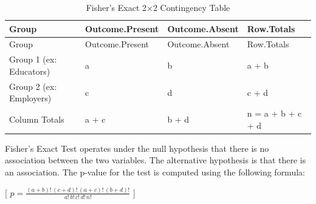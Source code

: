 \documentclass[
  11pt,
  letterpaper,
  DIV=11,
  numbers=noendperiod]{scrartcl}
\numberwithin{figure}{section}
\begin{document}
\begin{longtable}[]{@{}
  >{\raggedright\arraybackslash}p{}
  >{\raggedleft\arraybackslash}p{}
  >{\raggedleft\arraybackslash}p{}
  >{\raggedright\arraybackslash}p{}@{}}
\caption{Fisher's Exact 2×2 Contingency Table}\tabularnewline
\toprule\noalign{}
\begin{minipage}[b]{\linewidth}\raggedright
Group
\end{minipage} & \begin{minipage}[b]{\linewidth}\raggedleft
Outcome.Present
\end{minipage} & \begin{minipage}[b]{\linewidth}\raggedleft
Outcome.Absent
\end{minipage} & \begin{minipage}[b]{\linewidth}\raggedright
Row.Totals
\end{minipage} \\
\midrule\noalign{}
\endfirsthead
\toprule\noalign{}
\begin{minipage}[b]{\linewidth}\raggedright
Group
\end{minipage} & \begin{minipage}[b]{\linewidth}\raggedleft
Outcome.Present
\end{minipage} & \begin{minipage}[b]{\linewidth}\raggedleft
Outcome.Absent
\end{minipage} & \begin{minipage}[b]{\linewidth}\raggedright
Row.Totals
\end{minipage} \\
\midrule\noalign{}
\endhead
\bottomrule\noalign{}
\endlastfoot
Group 1 (ex: Educators) & a & b & a + b \\
Group 2 (ex: Employers) & c & d & c + d \\
Column Totals & a + c & b + d & n = a + b + c + d \\
\end{longtable}

Fisher's Exact Test operates under the null hypothesis that there is no
association between the two variables. The alternative hypothesis is
that there is an association. The p-value for the test is computed using
the following formula:

{[}
\(p = \frac{(a+b)! \, (c+d)! \, (a+c)! \, (b+d)!}{a! \, b! \, c! \, d! \, n!}\)
{]}
\end{document}

